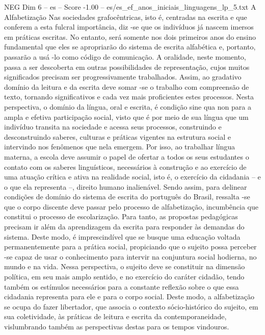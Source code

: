 \begin{textsample}{NEG Dim 6 – es – Score -1.00 – es/es\_ef\_anos\_iniciais\_linguagens\_lp\_5.txt}  \label{ex:f6_neg_141}
A Alfabetização Nas sociedades grafocêntricas, isto é, centradas na escrita e que conferem a esta fulcral importância, diz -se que os indivíduos já nascem imersos em práticas escritas.
No entanto, será somente nos dois primeiros anos do ensino fundamental que eles se apropriarão do sistema de escrita alfabética e, portanto, passarão a usá -lo como código de comunicação.
A oralidade, neste momento, passa a ser descoberta em outras possibilidades de representação, cujos muitos significados precisam ser progressivamente trabalhados.
Assim, ao gradativo domínio da leitura e da escrita deve somar -se o trabalho com compreensão de texto, tornando significativos e cada vez mais proficientes estes processos.
Nesta perspectiva, o domínio da língua, oral e escrita, é condição sine qua non para a ampla e efetiva participação social, visto que é por meio de sua língua que um indivíduo transita na sociedade e acessa seus processos, construindo e desconstruindo saberes, culturas e práticas vigentes na estrutura social e intervindo nos fenômenos que nela emergem.
Por isso, ao trabalhar língua materna, a escola deve assumir o papel de ofertar a todos os seus estudantes o contato com os saberes linguísticos, necessários à construção e ao exercício de uma atuação crítica e ativa na realidade social, isto é, o exercício da cidadania – e o que ela representa –, direito humano inalienável.
Sendo assim, para delinear condições de domínio do sistema de escrita do português do Brasil, ressalta -se que o corpo discente deve passar pelo processo de alfabetização, incumbência que constitui o processo de escolarização.
Para tanto, as propostas pedagógicas precisam ir além da aprendizagem da escrita para responder às demandas do sistema.
Deste modo, é imprescindível que se busque uma educação voltada permanentemente para a prática social, propiciando que o sujeito possa perceber -se capaz de usar o conhecimento para intervir na conjuntura social hodierna, no mundo e na vida.
Nessa perspectiva, o sujeito deve se constituir na dimensão política, em seu mais amplo sentido, e no exercício do caráter cidadão, tendo também os estímulos necessários para a constante reflexão sobre o que essa cidadania representa para ele e para o corpo social.
Deste modo, a alfabetização se ocupa do fazer libertador, que associa o contexto sócio-histórico do sujeito, em sua coletividade, às práticas de leitura e escrita da contemporaneidade, vislumbrando também as perspectivas destas para os tempos vindouros.

\end{textsample}
